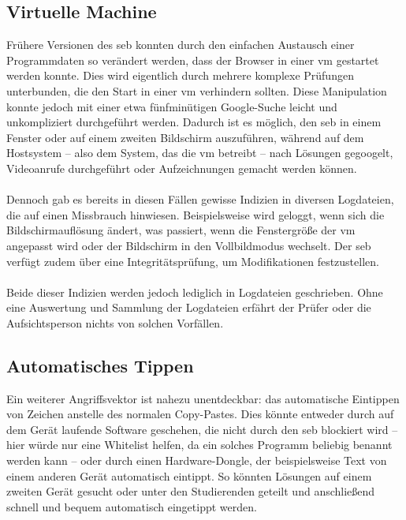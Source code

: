 \subsection{Virtuelle Machine}
Frühere Versionen des \gls{seb} konnten durch den einfachen Austausch einer Programmdaten so verändert werden, dass der Browser in einer \gls{vm} gestartet werden konnte. 
Dies wird eigentlich durch mehrere komplexe Prüfungen unterbunden, die den Start in einer \gls{vm} verhindern sollten. 
Diese Manipulation konnte jedoch mit einer etwa fünfminütigen Google-Suche leicht und unkompliziert durchgeführt werden. 
Dadurch ist es möglich, den \gls{seb} in einem Fenster oder auf einem zweiten Bildschirm auszuführen, während auf dem Hostsystem – also dem System, das die \gls{vm} betreibt – nach Lösungen gegoogelt, Videoanrufe durchgeführt oder Aufzeichnungen gemacht werden können.\\
\\
Dennoch gab es bereits in diesen Fällen gewisse Indizien in diversen Logdateien, die auf einen Missbrauch hinwiesen. 
Beispielsweise wird geloggt, wenn sich die Bildschirmauflösung ändert, was passiert, wenn die Fenstergröße der \gls{vm} angepasst wird oder der Bildschirm in den Vollbildmodus wechselt. 
Der \gls{seb} verfügt zudem über eine Integritätsprüfung, um Modifikationen festzustellen.\\
\\
Beide dieser Indizien werden jedoch lediglich in Logdateien geschrieben. 
Ohne eine Auswertung und Sammlung der Logdateien erfährt der Prüfer oder die Aufsichtsperson nichts von solchen Vorfällen.

\subsection{Automatisches Tippen}
Ein weiterer Angriffsvektor ist nahezu unentdeckbar: das automatische Eintippen von Zeichen anstelle des normalen Copy-Pastes. 
Dies könnte entweder durch auf dem Gerät laufende Software geschehen, die nicht durch den \gls{seb} blockiert wird – hier würde nur eine Whitelist helfen, da ein solches Programm beliebig benannt werden kann – oder durch einen Hardware-Dongle, der beispielsweise Text von einem anderen Gerät automatisch eintippt. 
So könnten Lösungen auf einem zweiten Gerät gesucht oder unter den Studierenden geteilt und anschließend schnell und bequem automatisch eingetippt werden.

